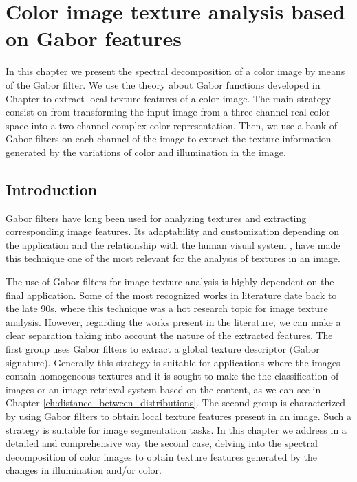 \chapter{Color image texture analysis based on Gabor features}

In this chapter we present the spectral decomposition of a color image by means of the Gabor filter. We use the theory about Gabor functions developed in Chapter to extract local texture features of a color image. The main strategy consist on from transforming the input image from a three-channel real color space into a two-channel complex color representation. Then, we use a bank of Gabor filters on each channel of the image to extract the texture information generated by the variations of color and illumination in the image.

\section{Introduction}

Gabor filters have long been used for analyzing textures and extracting corresponding image features. Its adaptability and customization depending on the application and the relationship with the human visual system \cite{Daugman:JOSA:1985a}, have made this technique one of the most relevant for the analysis of textures in an image.

The use of Gabor filters for image texture analysis is highly dependent on the final application. Some of the most recognized works in literature date back to the late 90s, where this technique was a hot research topic for image texture analysis. However, regarding the works present in the literature, we can make a clear separation taking into account the nature of the extracted features. The first group uses Gabor filters to extract a global texture descriptor (Gabor signature). Generally this strategy is suitable for applications where the images contain homogeneous textures and it is sought to make the the classification of images or an image retrieval system based on the content, as we can see in Chapter \ref{ch:distance_between_distributions}. The second group is characterized by using Gabor filters to obtain local texture features present in an image. Such a strategy is suitable for image segmentation tasks. In this chapter we address in a detailed and comprehensive way the second case, delving into the spectral decomposition of color images to obtain texture features generated by the changes in illumination and/or color.


